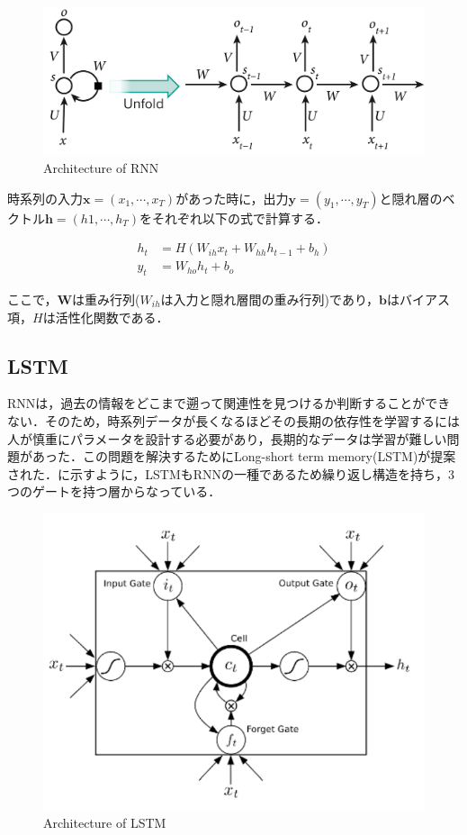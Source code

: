 \begin{figure}[H]
	\centering
	\includegraphics[width=0.7\linewidth]{fig/simpleRNN}
	\caption{Architecture of RNN\cite{simpleRNN}}
	\label{fig:simpleRNN}
\end{figure}


時系列の入力$\bm{x} = (x_1, \cdots , x_T)$があった時に，出力$\bm{y} = (y_1, \cdots , y_T)$と隠れ層のベクトル$\bm{h} = (h1, \cdots ,h_T)$をそれぞれ以下の式で計算する．

\begin{align}\label{eq:RNN}
	h_t & = H(W_{ih} x_t + W_{hh} h_{t-1} + b_h) \\ 
	y_t & = W_{ho} h_t + b_o
\end{align}

ここで，$\bm{W}$は重み行列($W_{ih}$は入力と隠れ層間の重み行列)であり，$\bm{b}$はバイアス項，$H$は活性化関数である．


\subsection*{LSTM}
RNNは，過去の情報をどこまで遡って関連性を見つけるか判断することができない．そのため，時系列データが長くなるほどその長期の依存性を学習するには人が慎重にパラメータを設計する必要があり，長期的なデータは学習が難しい問題があった．この問題を解決するためにLong-short term memory(LSTM)が提案された．に示すように，LSTMもRNNの一種であるため繰り返し構造を持ち，3つのゲートを持つ層からなっている．

\begin{figure}[H]
	\centering
	\includegraphics[width=0.7\linewidth]{fig/lstm.png}
	\caption{Architecture of LSTM}
	\label{fig:LSTM}
\end{figure}

